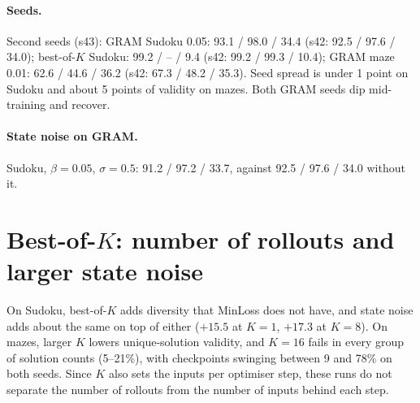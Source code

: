 \documentclass[11pt]{article}
\newcommand{\bok}{best-of-$K$}
\newcommand{\Bok}{Best-of-$K$}
\begin{document}
\paragraph{Seeds.} Second seeds (s43): GRAM Sudoku 0.05: 93.1 / 98.0 / 34.4 (s42: 92.5 / 97.6 / 34.0); \bok{} Sudoku:
99.2 / -- / 9.4 (s42: 99.2 / 99.3 / 10.4); GRAM maze 0.01: 62.6 / 44.6 / 36.2 (s42: 67.3 / 48.2 / 35.3). Seed spread is
under 1 point on Sudoku and about 5 points of validity on mazes. Both GRAM seeds dip mid-training and recover.

\paragraph{State noise on GRAM.} Sudoku, $\beta=0.05$, $\sigma=0.5$: 91.2 / 97.2 / 33.7, against 92.5 / 97.6 / 34.0
without it.

\section{\Bok{}: number of rollouts and larger state noise}

\begin{table}[h]
\centering\small
{}
\caption{The baseline across $K$ at matched compute. Sudoku $K=16$ trained for 300k steps: 98.6 / -- / 12.9. Maze
$K=16$ second seed: 40.7 / 43.0 / 1.6.}
\end{table}

On Sudoku, \bok{} adds diversity that MinLoss does not have, and state noise adds about the same on top of either
($+15.5$ at $K=1$, $+17.3$ at $K=8$). On mazes, larger $K$ lowers unique-solution validity, and $K=16$ fails in every
group of solution counts (5--21\%), with checkpoints swinging between 9 and 78\% on both seeds. Since $K$ also sets the
inputs per optimiser step, these runs do not separate the number of rollouts from the number of inputs behind each step.
\end{document}
